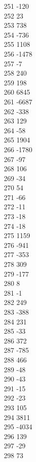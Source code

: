 { 251	-120 \\
 252	23 \\
 253	738 \\
 254	-736 \\
 255	1108 \\
 256	-1478 \\
 257	-7 \\
 258	240 \\
 259	198 \\
 260	6845 \\
 261	-6687 \\
 262	-338 \\
 263	129 \\
 264	-58 \\
 265	1904 \\
 266	-1780 \\
 267	-97 \\
 268	106 \\
 269	-34 \\
 270	54 \\
 271	-66 \\
 272	-11 \\
 273	-18 \\
 274	-18 \\
 275	1159 \\
 276	-941 \\
 277	-353 \\
 278	309 \\
 279	-177 \\
 280	8 \\
 281	-1 \\
 282	249 \\
 283	-388 \\
 284	231 \\
 285	-33 \\
 286	372 \\
 287	-785 \\
 288	466 \\
 289	-48 \\
 290	-43 \\
 291	-15 \\
 292	-23 \\
 293	105 \\
 294	3811 \\
 295	-4034 \\
 296	139 \\
 297	-29 \\
 298	73 \\
}
